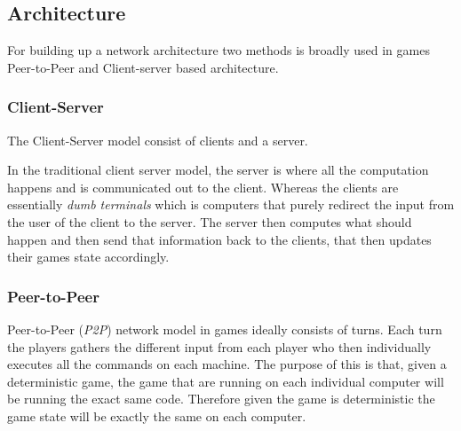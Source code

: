 \subsection{Architecture}
For building up a network architecture two methods is broadly used in games Peer-to-Peer and Client-server based architecture. 


\subsubsection{Client-Server}
The Client-Server model consist of clients and a server. 

In the traditional client server model, the server is where all the computation happens and is communicated out to the client.
Whereas the clients are essentially \textit{dumb terminals} which is computers that purely redirect the input from the user of the client to the server. 
The server then computes what should happen and then send that information back to the clients, that then updates their games state accordingly.


\subsubsection{Peer-to-Peer}
Peer-to-Peer (\textit{P2P}) network model in games ideally consists of turns. 
Each turn the players gathers the different input from each player who then individually executes all the commands on each machine.
The purpose of this is that, given a deterministic game, the game that are running on each individual computer will be running the exact same code. 
Therefore given the game is deterministic the game state will be exactly the same on each computer. 
